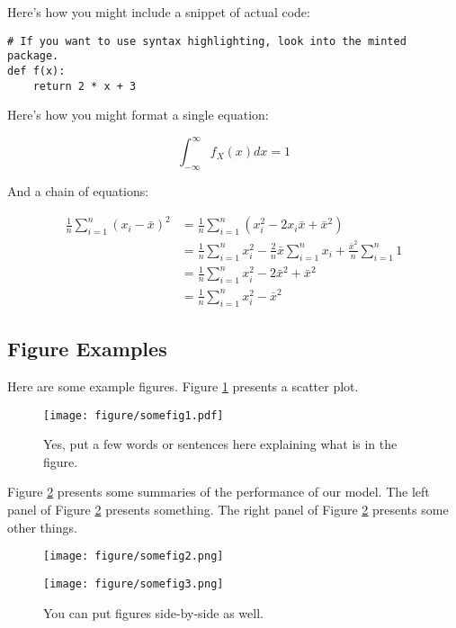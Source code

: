 \documentclass[12pt,letterpaper]{article}
\begin{document}
Here's how you might include a snippet of actual code:

\begin{verbatim}
# If you want to use syntax highlighting, look into the minted package.
def f(x):
    return 2 * x + 3
\end{verbatim}

Here's how you might format a single equation:

$$\int_{-\infty}^\infty f_X(x)dx = 1$$

And a chain of equations:

\begin{align*}
    \frac{1}{n}\sum_{i = 1}^n (x_i - \bar{x})^2 &= \frac{1}{n}\sum_{i = 1}^n (x_i^2 - 2x_i\bar{x} + \bar{x}^2)
    \\ &= \frac{1}{n}\sum_{i = 1}^n x_i^2 - \frac{2}{n}\bar{x}\sum_{i = 1}^n x_i + \frac{\bar{x}^2}{n}\sum_{i = 1}^n 1
    \\ &= \frac{1}{n}\sum_{i = 1}^n x_i^2 - 2\bar{x}^2 + \bar{x}^2
    \\ &= \frac{1}{n}\sum_{i = 1}^n x_i^2 - \bar{x}^2
\end{align*}


\subsection{Figure Examples}

Here are some example figures. 
Figure \ref{fig:somefig1} presents a scatter plot.

\begin{figure}[htbp]
\centering
\texttt{[image: figure/somefig1.pdf]}
\caption{Yes, put a few words or sentences here explaining what is in the figure.}
\label{fig:somefig1}
\end{figure}

Figure \ref{fig:someotherfigs} presents some summaries of the performance of our model.
The left panel of Figure \ref{fig:someotherfigs} presents something.
The right panel of Figure \ref{fig:someotherfigs} presents some other things.

\begin{figure}[htbp]
\begin{minipage}{0.53\linewidth}
  \centering
  \texttt{[image: figure/somefig2.png]}
\end{minipage}
\begin{minipage}{0.42\linewidth}
  \centering
  \texttt{[image: figure/somefig3.png]}
\end{minipage}
\caption{You can put figures side-by-side as well.}
\label{fig:someotherfigs}
\end{figure}
\end{document}
